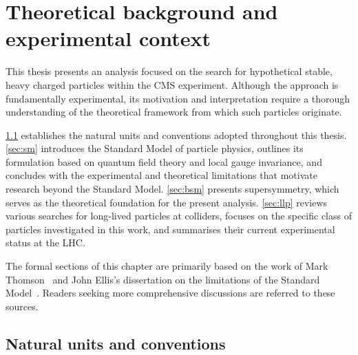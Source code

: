 \chapter{Theoretical background and experimental context}
\label{ch:chapitre3}
\minitoc

This thesis presents an analysis focused on the search for hypothetical stable, heavy charged particles within the CMS experiment. Although the approach is fundamentally experimental, its motivation and interpretation require a thorough understanding of the theoretical framework from which such particles originate.

\cref{sec:units} establishes the natural units and conventions adopted throughout this thesis. \cref{sec:sm} introduces the Standard Model of particle physics, outlines its formulation based on quantum field theory and local gauge invariance, and concludes with the experimental and theoretical limitations that motivate research beyond the Standard Model. \cref{sec:bsm} presents supersymmetry, which serves as the theoretical foundation for the present analysis. \cref{sec:llp} reviews various searches for long-lived particles at colliders, focuses on the specific class of particles investigated in this work, and summarises their current experimental status at the LHC.

The formal sections of this chapter are primarily based on the work of Mark Thomson~\cite{Thomson_2013} and John Ellis's dissertation on the limitations of the Standard Model~\cite{Ellis:591472}. Readers seeking more comprehensive discussions are referred to these sources.


\section{Natural units and conventions}
\label{sec:units}

